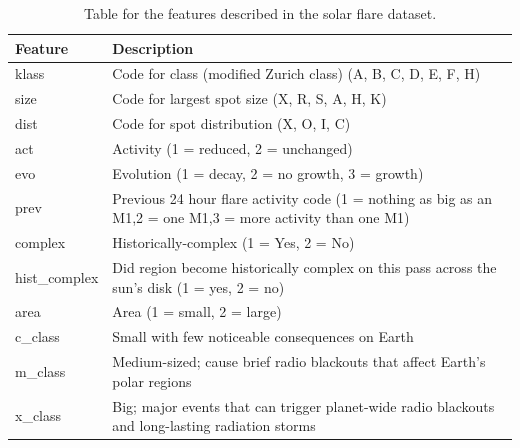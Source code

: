 \setlength{\tablewidth}{1.6\linewidth}
\begin{table}
    \setlength{\DUtablewidth}{\tablewidth}
    \begin{longtable*}{l|l}
        \hline 
        \textbf{Feature} & \textbf{Description} \\
        \hline
        klass & Code for class (modified Zurich class) (A, B, C, D, E, F, H) \\
        size & Code for largest spot size (X, R, S, A, H, K) \\
        dist & Code for spot distribution (X, O, I, C) \\
        act & Activity (1 = reduced, 2 = unchanged) \\
        evo & Evolution (1 = decay, 2 = no growth, 3 = growth) \\
        prev & Previous 24 hour flare activity code (1 = nothing as big as an M1,2 = one M1,3 = more activity than one M1) \\
        complex & Historically-complex (1 = Yes, 2 = No) \\
        hist\_complex & Did region become historically complex on this pass across the sun's disk (1 = yes, 2 = no) \\
        area & Area (1 = small, 2 = large) \\
        c\_class & Small with few noticeable consequences on Earth \\
        m\_class & Medium-sized; cause brief radio blackouts that affect Earth's polar regions \\
        x\_class & Big; major events that can trigger planet-wide radio blackouts and long-lasting radiation storms \\
        \hline
    \end{longtable*}
    \caption{Table for the features described in the solar flare dataset.}
    \label{data_features}
\end{table}
